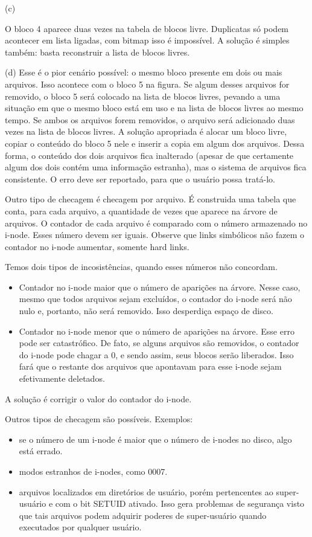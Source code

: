 \documentclass{article}
\begin{document}
{\color{blue} (c)}

O bloco 4 aparece duas vezes na tabela de blocos livre. Duplicatas só podem acontecer em lista ligadas, com bitmap isso é impossível. A solução é simples também: basta reconstruir a lista de blocos livres.



{\color{blue} (d)}
Esse é o pior cenário possível: o mesmo bloco presente em dois ou mais arquivos. Isso acontece com o bloco 5 na figura. Se algum desses arquivos for removido, o bloco 5 será colocado na lista de blocos livres, pevando a uma situação em que o mesmo bloco está em uso e na lista de blocos livres ao mesmo tempo. Se ambos os arquivos forem removidos, o arquivo será adicionado duas vezes na lista de blocos livres. A solução apropriada é alocar um bloco livre, copiar o conteúdo do bloco 5 nele e inserir a copia em algum dos arquivos. Dessa forma, o conteúdo dos dois arquivos fica inalterado (apesar de que certamente algum dos dois contém uma informação estranha), mas o sistema de arquivos fica consistente. O erro deve ser reportado, para que o usuário possa tratá-lo.

Outro tipo de checagem é checagem por arquivo. É construida uma tabela que conta, para cada arquivo, a quantidade de vezes que aparece na árvore de arquivos. O contador de cada arquivo é comparado com o número armazenado no i-node. Esses número devem ser iguais. Observe que links simbólicos não fazem o contador no i-node aumentar, somente hard links.

Temos dois tipos de incosistências, quando esses números não concordam.

\begin{itemize}
  \item Contador no i-node maior que o número de aparições na árvore. Nesse caso, mesmo que todos arquivos sejam excluídos, o contador do i-node será não nulo e, portanto, não será removido. Isso desperdiça espaço de disco.   \item Contador no i-node menor que o número de aparições na árvore. Esse erro pode ser catastrófico. De fato, se alguns arquivos são removidos, o contador do i-node pode chagar a 0, e sendo assim, seus blocos serão liberados. Isso fará que o restante dos arquivos que apontavam para esse i-node sejam efetivamente deletados. 
\end{itemize}

A solução é corrigir o valor do contador do i-node.

Outros tipos de checagem são possíveis. Exemplos: 
\begin{itemize}
  \item se o número de um i-node é maior que o número de i-nodes no disco, algo está errado. 
  \item modos estranhos de i-nodes, como 0007.
  \item arquivos localizados em diretórios de usuário, porém pertencentes ao super-usuário e com o bit SETUID ativado. Isso gera problemas de segurança visto que tais arquivos podem adquirir poderes de super-usuário quando executados por qualquer usuário.
\end{itemize}
\end{document}
